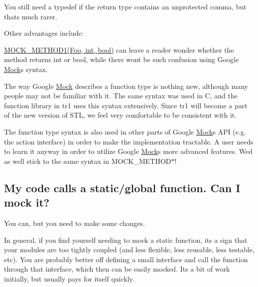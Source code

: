 You still need a {\ttfamily typedef} if the return type contains an unprotected comma, but that\textquotesingle{}s much rarer.

Other advantages include\+:
\begin{DoxyEnumerate}
\item {\ttfamily \hyperlink{gmock-generated-function-mockers_8h_ac49d366be035ee87b73264a29059cdc7}{M\+O\+C\+K\+\_\+\+M\+E\+T\+H\+O\+D1(\+Foo, int, bool)}} can leave a reader wonder whether the method returns {\ttfamily int} or {\ttfamily bool}, while there won\textquotesingle{}t be such confusion using Google \hyperlink{class_mock}{Mock}\textquotesingle{}s syntax.
\end{DoxyEnumerate}
\begin{DoxyEnumerate}
\item The way Google \hyperlink{class_mock}{Mock} describes a function type is nothing new, although many people may not be familiar with it. The same syntax was used in C, and the {\ttfamily function} library in {\ttfamily tr1} uses this syntax extensively. Since {\ttfamily tr1} will become a part of the new version of S\+TL, we feel very comfortable to be consistent with it.
\end{DoxyEnumerate}
\begin{DoxyEnumerate}
\item The function type syntax is also used in other parts of Google \hyperlink{class_mock}{Mock}\textquotesingle{}s A\+PI (e.\+g. the action interface) in order to make the implementation tractable. A user needs to learn it anyway in order to utilize Google \hyperlink{class_mock}{Mock}\textquotesingle{}s more advanced features. We\textquotesingle{}d as well stick to the same syntax in {\ttfamily M\+O\+C\+K\+\_\+\+M\+E\+T\+H\+O\+D$\ast$}!
\end{DoxyEnumerate}

\subsection*{My code calls a static/global function. Can I mock it?}

You can, but you need to make some changes.

In general, if you find yourself needing to mock a static function, it\textquotesingle{}s a sign that your modules are too tightly coupled (and less flexible, less reusable, less testable, etc). You are probably better off defining a small interface and call the function through that interface, which then can be easily mocked. It\textquotesingle{}s a bit of work initially, but usually pays for itself quickly.

